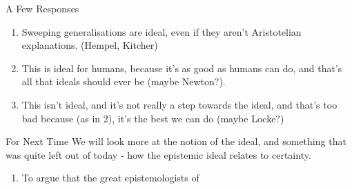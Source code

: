 \documentclass[
  17pt,
  letterpaper,
  ignorenonframetext,
  aspectratio=169,
  handout]{beamer}
\providecommand{\tightlist}{%
  \setlength{\itemsep}{0pt}\setlength{\parskip}{0pt}}\usepackage{longtable,booktabs,array}
\begin{document}
\begin{frame}{A Few Responses}
\protect\hypertarget{a-few-responses}{}
\begin{enumerate}[<+->]
\tightlist
\item
  Sweeping generalisations are ideal, even if they aren't Aristotelian
  explanations. (Hempel, Kitcher)
\item
  This is ideal for humans, because it's as good as humans can do, and
  that's all that ideals should ever be (maybe Newton?).
\item
  This isn't ideal, and it's not really a step towards the ideal, and
  that's too bad because (as in 2), it's the best we can do (maybe
  Locke?)
\end{enumerate}
\end{frame}

\begin{frame}{For Next Time}
\protect\hypertarget{for-next-time}{}
We will look more at the notion of the ideal, and something that was
quite left out of today - how the epistemic ideal relates to certainty.

\begin{enumerate}[<+->]
\tightlist
\item
  To argue that the great epistemologists of
\end{enumerate}
\end{frame}
\end{document}
